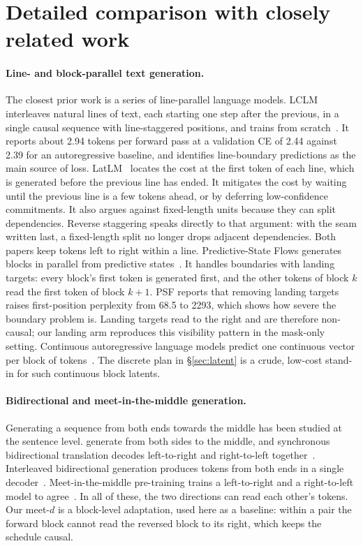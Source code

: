 \documentclass[11pt]{article}
\theoremstyle{definition}
\theoremstyle{remark}
\newcommand{\sch}[1]{\textsf{#1}}
\begin{document}
\section{Detailed comparison with closely related work}
\label{app:related}

\paragraph{Line- and block-parallel text generation.}
The closest prior work is a series of line-parallel language models.
LCLM interleaves natural lines of text, each starting one step after the previous, in a single causal sequence with line-staggered positions, and trains from scratch~\citep{li2026lclm}.
It reports about 2.94 tokens per forward pass at a validation CE of 2.44 against 2.39 for an autoregressive baseline, and identifies line-boundary predictions as the main source of loss.
LatLM~\citep{zhang2026latlm} locates the cost at the first token of each line, which is generated before the previous line has ended.
It mitigates the cost by waiting until the previous line is a few tokens ahead, or by deferring low-confidence commitments.
It also argues against fixed-length units because they can split dependencies.
Reverse staggering speaks directly to that argument: with the seam written last, a fixed-length split no longer drops adjacent dependencies.
Both papers keep tokens left to right within a line.
Predictive-State Flows generates blocks in parallel from predictive states~\citep{he2026psf}.
It handles boundaries with landing targets: every block's first token is generated first, and the other tokens of block $k$ read the first token of block $k+1$.
PSF reports that removing landing targets raises first-position perplexity from 68.5 to 2293, which shows how severe the boundary problem is.
Landing targets read to the right and are therefore non-causal; our \sch{landing} arm reproduces this visibility pattern in the mask-only setting.
Continuous autoregressive language models predict one continuous vector per block of tokens~\citep{shao2025calm}.
The discrete plan in \S\ref{sec:latent} is a crude, low-cost stand-in for such continuous block latents.

\paragraph{Bidirectional and meet-in-the-middle generation.}
Generating a sequence from both ends towards the middle has been studied at the sentence level.
\citet{zhou2019bothsides} generate from both sides to the middle, and synchronous bidirectional translation decodes left-to-right and right-to-left together~\citep{zhou2019sbnmt}.
Interleaved bidirectional generation produces tokens from both ends in a single decoder~\citep{zhang2020interleaved}.
Meet-in-the-middle pre-training trains a left-to-right and a right-to-left model to agree~\citep{nguyen2023meet}.
In all of these, the two directions can read each other's tokens.
Our \sch{meet-$d$} is a block-level adaptation, used here as a baseline: within a pair the forward block cannot read the reversed block to its right, which keeps the schedule causal.
\end{document}
